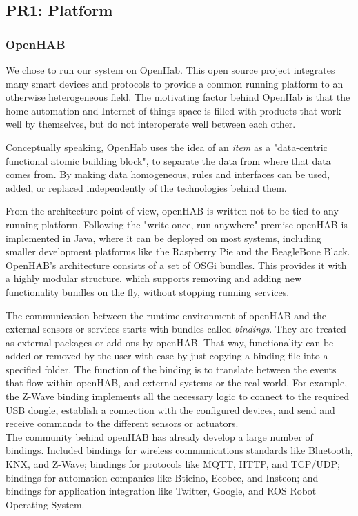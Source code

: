 \subsection{PR1: Platform}

\subsubsection{OpenHAB}

We chose to run our system on OpenHab\cite{openhabIntro}. This open source project integrates many smart devices and protocols to provide a common running platform to an otherwise heterogeneous field. The motivating factor behind OpenHab is that the home automation and Internet of things space is filled with products that work well by themselves, but do not interoperate well between each other. 

Conceptually speaking, OpenHab uses the idea of an \textit{item} as a "data-centric functional atomic building block"\cite{openhabIntro}, to separate the data from where that data comes from. By making data homogeneous, rules and interfaces can be used, added, or replaced independently of the technologies behind them.

From the architecture point of view, openHAB is written not to be tied to any running platform. Following the "write once, run anywhere" premise openHAB is implemented in Java, where it can be deployed on most systems, including smaller development platforms like the Raspberry Pie and the BeagleBone Black\cite{openhabSupported}.\\
OpenHAB's architecture consists of a set of OSGi bundles. This provides it with a highly modular structure, which supports removing and adding new functionality bundles on the fly, without stopping running services\cite{openhabRuntime}.

The communication between the runtime environment of openHAB and the external sensors or services starts with bundles called \textit{bindings}. They are treated as external packages or add-ons by openHAB. That way, functionality can be added or removed by the user with ease by just copying a binding file into a specified folder. The function of the binding is to translate between the events that flow within openHAB, and external systems\cite{openhabBinding} or the real world. For example, the Z-Wave binding implements all the necessary logic to connect to the required USB dongle, establish a connection with the configured devices, and send and receive commands to the different sensors or actuators. \\
The community behind openHAB has already develop a large number of bindings. Included bindings for wireless communications standards like Bluetooth, KNX, and Z-Wave; bindings for protocols like MQTT, HTTP, and TCP/UDP; bindings for automation companies like Bticino, Ecobee, and Insteon; and bindings for application integration like Twitter, Google, and ROS Robot Operating System\cite{openhabBinding}.

